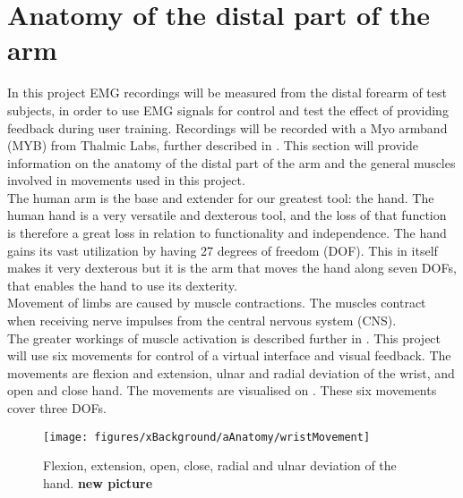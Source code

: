 \section{Anatomy of the distal part of the arm} \label{sec:anatomy}


In this project EMG recordings will be measured from the distal forearm of test subjects, in order to use EMG signals for control and test the effect of providing feedback during user training. Recordings will be recorded with a Myo armband (MYB) from Thalmic Labs, further described in . This section will provide information on the anatomy of the distal part of the arm and the general muscles involved in movements used in this project.\\
The human arm is the base and extender for our greatest tool: the hand. The human hand is a very versatile and dexterous tool, and the loss of that function is therefore a great loss in relation to functionality and independence. The hand gains its vast utilization by having 27 degrees of freedom (DOF). This in itself makes it very dexterous but it is the arm that moves the hand along seven DOFs, that enables the hand to use its dexterity.\\
Movement of limbs are caused by muscle contractions. The muscles contract when receiving nerve impulses from the central nervous system (CNS). \cite{Martini2012} \\
The greater workings of muscle activation is described further in . This project will use six movements for control of a virtual interface and visual feedback. The movements are flexion and extension, ulnar and radial deviation of the wrist, and open and close hand. The movements are visualised on . These six movements cover three DOFs. 

\begin{figure}[H] 
	\texttt{[image: figures/xBackground/aAnatomy/wristMovement]}
	\caption{Flexion, extension, open, close, radial and ulnar deviation of the hand. \textbf{new picture}}
	\label{fig:wristMovement}
\end{figure}

